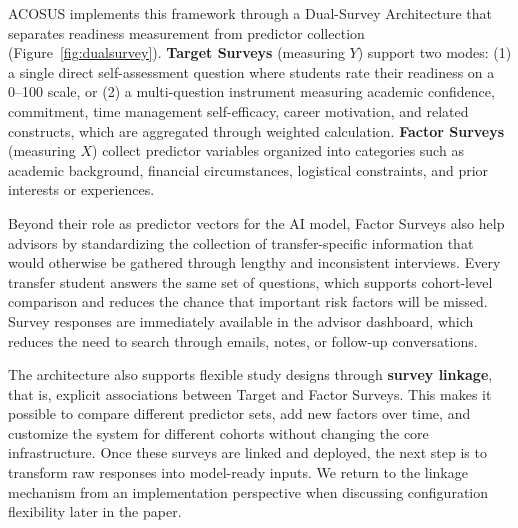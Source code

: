 \documentclass[letterpaper,11pt]{article}
\begin{document}
ACOSUS implements this framework through a Dual-Survey Architecture that separates readiness measurement from predictor collection (Figure~\ref{fig:dualsurvey}). \textbf{Target Surveys} (measuring $Y$) support two modes: (1) a single direct self-assessment question where students rate their readiness on a 0--100 scale, or (2) a multi-question instrument measuring academic confidence, commitment, time management self-efficacy, career motivation, and related constructs, which are aggregated through weighted calculation. \textbf{Factor Surveys} (measuring $X$) collect predictor variables organized into categories such as academic background, financial circumstances, logistical constraints, and prior interests or experiences.

Beyond their role as predictor vectors for the AI model, Factor Surveys also help advisors by standardizing the collection of transfer-specific information that would otherwise be gathered through lengthy and inconsistent interviews. Every transfer student answers the same set of questions, which supports cohort-level comparison and reduces the chance that important risk factors will be missed. Survey responses are immediately available in the advisor dashboard, which reduces the need to search through emails, notes, or follow-up conversations.

The architecture also supports flexible study designs through \textbf{survey linkage}, that is, explicit associations between Target and Factor Surveys. This makes it possible to compare different predictor sets, add new factors over time, and customize the system for different cohorts without changing the core infrastructure. Once these surveys are linked and deployed, the next step is to transform raw responses into model-ready inputs. We return to the linkage mechanism from an implementation perspective when discussing configuration flexibility later in the paper.
\end{document}
